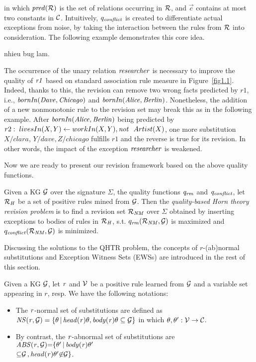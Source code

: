 in which $\mathit{pred(\mathcal{R})}$ is the set of relations occurring in $\mathcal{R}$, and $\vec{c}$ contains at most two constants in $\mathcal{C}$. Intuitively, $q_{\mathit{conflict}}$ is created to differentiate actual exceptions from noise, by taking the interaction between the rules from $\mathcal{R}$ into consideration. The following example demonstrates this core idea.

\begin{example}

nhieu bug lam.

The occurrence of the unary relation $\mathit{researcher}$ is necessary to improve the quality of $\mathit{r1}$ based on standard association rule measure in Figure~\ref{fig1.1}. Indeed, thanks to this, the revision can remove two wrong facts predicted by $r1$, i.e., $\mathit{bornIn(Dave,Chicago)}$ and $\mathit{bornIn(Alice,Berlin)}$. Nonetheless, the addition of a new nonmonotonic rule to the revision set may break this as in the following example. After $\mathit{bornIn(Alice,Berlin)}$ being predicted by $r2:\; livesIn(X,Y)\leftarrow workIn(X,Y),\mathit{not}~ \ Artist(X)$, one more substitution $X/clara$, $Y/dave,Z/chicago$ fulfills $r1$ and the reverse is true for its revision. In other words, the impact of the exception $\mathit{researcher}$ is weakened.
\end{example}

Now we are ready to present our revision framework based on the above quality functions.

\begin{definition} \label{def:qhtr}
Given a KG $\mathcal{G}$ over the signature $\Sigma$, the quality functions $\mathit{q_{rm}}$ and $\mathit{q_{conflict}}$, let $\mathcal{R}_{\mathit{H}}$ be a set of positive rules mined from $\mathcal{G}$. Then the \emph{quality-based Horn theory revision problem} is to find a revision set $\mathcal{R}_{\mathit{NM}}$ over $\Sigma$ obtained by inserting exceptions to bodies of rules in $\mathcal{R}_{\mathit{H}}$, s.t. $q_{\mathit{rm}}(\mathcal{R}_{\mathit{NM}},\mathcal{G})$ is maximized and $q_{\mathit{conflict}}(\mathcal{R}_{\mathit{NM}},\mathcal{G})$ is minimized.
\end{definition}

Discussing the solutions to the QHTR problem, the concepts of $r$-(ab)normal substitutions and Exception Witness Sets (EWSs) are introduced in the rest of this section.

\begin{definition}\label{sec:rulelearn}
Given a KG $\mathcal{G}$, let $\mathit{r}$ and $\mathcal{V}$ be a positive rule learned from $\mathcal{G}$ and a variable set appearing in $r$, resp. We have the following notations:

\begin{itemize}
\item The $\mathit{r}$-normal set of substitutions are defined as $\mathit{NS(r, \mathcal{G})=\{\theta\, |\, head(r)\theta,body(r)\theta \subseteq \mathcal{G}\}}$ in which $\theta,\theta':\mathcal{V} \rightarrow \mathcal{C}$.
\item By contrast, the $\mathit{r}$-abnormal set of substitutions are $\mathit{ABS(r, \mathcal{G}){=}\{\theta'\, |\, body(r)\theta'}$\\ $\mathit{{\subseteq} \mathcal{G}\,{,}\,head(r)\theta' {\not \in} \mathcal{G}\}}$.
\end{itemize}
\end{definition}

